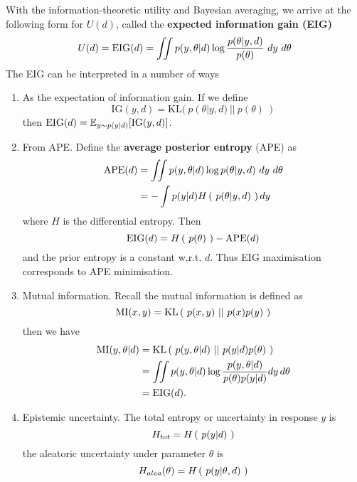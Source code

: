 With the information-theoretic utility and Bayesian averaging, we arrive at the following form for $U(d)$, called the \textbf{expected information gain (EIG)}
\begin{equation}
	U(d) = \text{EIG}(d) = \iint p(y, \theta | d) \log\frac{p(\theta | y, d)}{p(\theta)} \ dy\ d\theta
\end{equation}
The EIG can be interpreted in a number of ways
\begin{enumerate}
\item As the expectation of information gain. If we define
\begin{equation}
	\text{IG}(y, d) = \text{KL}(\ p(\theta | y, d)\ ||\ p(\theta)\ ) 
\end{equation}
then $\text{EIG}(d) = \mathbb{E}_{y\sim p(y|d)}[\text{IG}(y, d)] $.
\item From APE. Define the \textbf{average posterior entropy} (APE) as 
\begin{align}
	\ape(d) &= \iint p(y, \theta | d) \log p(\theta | y, d) \ dy \ d\theta \\
	&= -\int p(y|d) \entropy{p(\theta | y, d)} dy
\end{align}
where $H$ is the differential entropy.
Then
\begin{equation}
	\label{eq:apeeig}
	\text{EIG}(d) = H\left(\ p(\theta)\ \right) - \text{APE}(d)
\end{equation}
and the prior entropy is a constant w.r.t. $d$. Thus EIG maximisation corresponds to APE
minimisation.
\item Mutual information. Recall the mutual information is defined as
\begin{equation}
	\text{MI}(x, y) = \text{KL}\left(\ p(x, y)\ ||\ p(x)p(y)\ \right)
\end{equation}
then we have
\begin{align}
	\text{MI}(y, \theta | d) &= \text{KL}\left(\ p(y, \theta | d)\ ||\ p(y|d)p(\theta)\ \right) \\
	&= \iint p(y, \theta | d) \log \frac{p(y, \theta | d)}{p(\theta)p(y|d)} dy \, d\theta \\
	&= \text{EIG}(d).
\end{align}
\item Epistemic uncertainty.
The total entropy or uncertainty in response $y$ is
\begin{equation}
	H_{tot} = H\left(\ p(y|d)\ \right)
\end{equation}
the aleatoric uncertainty under parameter $\theta$ is
\begin{equation}
	H_{alea}(\theta) = H\left(\ p(y|\theta, d)\ \right)
\end{equation}

\end{enumerate}
